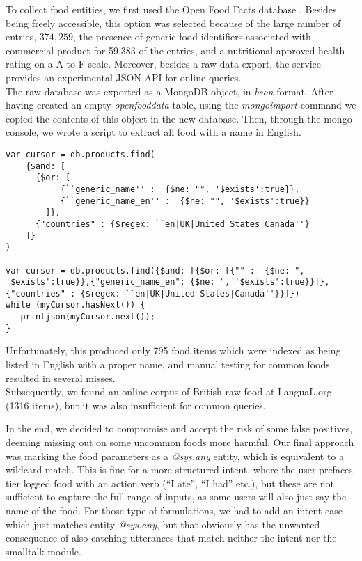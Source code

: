 To collect food entities, we first used the Open Food Facts database \cite{openfoodfacts}. Besides being freely accessible, this option was selected because of the large number of entries, $374,259$, the presence of generic food identifiers associated with commercial product for 59,383 of the entries, and a nutritional approved health rating on a A to F scale. Moreover, besides a raw data export, the service provides an experimental JSON API for online queries. \\
The raw database was exported as a MongoDB \cite{mongo} object, in \textit{bson} format. After having created an empty \textit{openfooddata} table, using the \textit{mongoimport} command we copied the contents of this object in the new database. Then, through the mongo console, we wrote a script to extract all food with a name in English.
\begin{lstlisting}
var cursor = db.products.find( 
    {$and: [
      {$or: [
           {``generic_name'' :  {$ne: "", '$exists':true}},
           {``generic_name_en'' :  {$ne: "", '$exists':true}}
        ]},
      {"countries" : {$regex: ``en|UK|United States|Canada''}
    ]}
)

var cursor = db.products.find({$and: [{$or: [{"" :  {$ne: ", '$exists':true}},{"generic_name_en": {$ne: ", '$exists':true}}]}, {"countries" : {$regex: ``en|UK|United States|Canada''}}]})
while (myCursor.hasNext()) {
   printjson(myCursor.next());
}
\end{lstlisting}

Unfortunately, this produced only 795 food items which were indexed as being listed in English with a proper name, and manual testing for common foods resulted in several misses.\\
Subsequently, we found an online corpus of British raw food at LanguaL.org \cite{langual}(1316 items), but it was also insufficient for common queries. 

In the end, we decided to compromise and accept the risk of some false positives, deeming missing out on some uncommon foods more harmful. Our final approach was marking the food parameters as a \textit{@sys.any} entity, which is equivalent to a wildcard match. This is fine for a more structured intent, where the user prefaces tier logged food with an action verb (``I ate'', ``I had'' etc.), but these are not sufficient to capture the full range of inputs, as some users will also just say the name of the food. For those type of formulations, we had to add an intent case which just matches entity \textit{@sys.any}, but that obviously has the unwanted consequence of also catching utterances that match neither the intent nor the smalltalk module.
